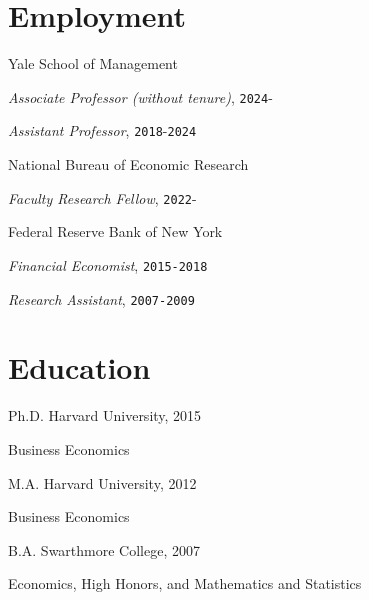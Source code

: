 \documentclass[letterpaper]{article}
\renewenvironment{itemize}{
  \begin{list}{}
    { \setlength{\itemsep}{5pt}
      \setlength{\parsep}{0pt}
      \setlength{\topsep}{0pt}
      \setlength{\leftmargin}{0em} } }{
  \end{list}}
\begin{document}
\section*{Employment}
\begin{itemize}
\item Yale School of Management
  \begin{itemize}
  \item \qquad \textit{Associate Professor (without tenure)}, \texttt{2024}-
  \item \qquad \textit{Assistant Professor}, \texttt{2018}-\texttt{2024}
  \end{itemize}  
\item National Bureau of Economic Research
  \begin{itemize}
  \item \qquad \textit{Faculty Research Fellow}, \texttt{2022}-
  \end{itemize}  
\item Federal Reserve Bank of New York
  \begin{itemize}
  \item \qquad \textit{Financial Economist}, \texttt{2015-2018}
  \item \qquad \textit{Research Assistant}, \texttt{2007-2009}
  \end{itemize}
\end{itemize}

\section*{Education}

\begin{itemize}
\item Ph.D. Harvard University, 2015
  \begin{itemize}
  \item Business Economics
  \end{itemize}
\item M.A. Harvard University, 2012
  \begin{itemize}
  \item Business Economics
  \end{itemize}
\item B.A. Swarthmore College, 2007
  \begin{itemize}
  \item Economics, High Honors, and Mathematics and Statistics
  \end{itemize}
\end{itemize}
\end{document}

